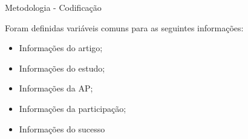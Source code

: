 \begin{frame}{Metodologia - Codificação}

Foram definidas variáveis comuns para as seguintes informações:

\vspace{0.5em}

\begin{itemize}
    \item Informações do artigo;
    \item Informações do estudo;
    \item Informações da AP;
    \item Informações da participação;
    \item Informações do sucesso
\end{itemize}
\end{frame}